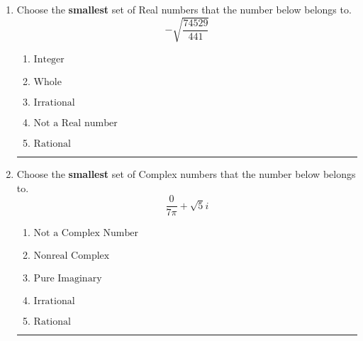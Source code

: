 \documentclass[14pt]{extbook}
\newcommand{\litem}[1]{\item#1\hspace*{-1cm}\rule{\textwidth}{0.4pt}}
\begin{document}
\begin{enumerate}
{\begin{enumerate}[label=\Alph*.]
\end{enumerate} }
\litem{
Choose the \textbf{smallest} set of Real numbers that the number below belongs to.\[ -\sqrt{\frac{74529}{441}} \]\begin{enumerate}[label=\Alph*.]
\item \( \text{Integer} \)
\item \( \text{Whole} \)
\item \( \text{Irrational} \)
\item \( \text{Not a Real number} \)
\item \( \text{Rational} \)

\end{enumerate} }
\litem{
Choose the \textbf{smallest} set of Complex numbers that the number below belongs to.\[ \frac{0}{7 \pi}+\sqrt{5}i \]\begin{enumerate}[label=\Alph*.]
\item \( \text{Not a Complex Number} \)
\item \( \text{Nonreal Complex} \)
\item \( \text{Pure Imaginary} \)
\item \( \text{Irrational} \)
\item \( \text{Rational} \)

\end{enumerate} }
\end{enumerate}
\end{document}
